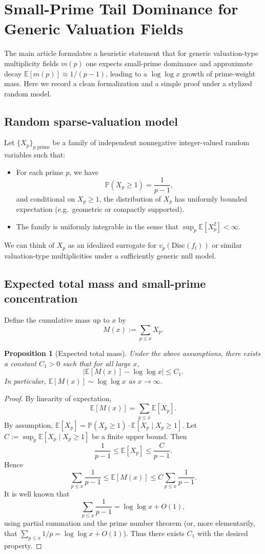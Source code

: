 \documentclass[11pt]{article}
\theoremstyle{definition}
\theoremstyle{plain}
\newtheorem{proposition}[definition]{Proposition}
\theoremstyle{remark}
\newcommand{\EE}{\mathbb{E}}
\newcommand{\Prob}{\mathbb{P}}
\newcommand{\1}{\mathbb{1}}
\begin{document}
\section{Small-Prime Tail Dominance for Generic Valuation Fields}

The main article formulates a heuristic statement that for generic valuation-type multiplicity fields \(m(p)\) one expects small-prime dominance and approximate decay \(\EE[m(p)] \approx 1/(p-1)\), leading to a \(\log\log x\) growth of prime-weight mass. Here we record a clean formalization and a simple proof under a stylized random model.

\subsection{Random sparse-valuation model}

Let \(\{X_p\}_{p \text{ prime}}\) be a family of independent nonnegative integer-valued random variables such that:

\begin{itemize}[leftmargin=*]
  \item For each prime \(p\), we have
  \[
    \Prob(X_p \ge 1) = \frac{1}{p-1},
  \]
  and conditional on \(X_p\ge 1\), the distribution of \(X_p\) has uniformly bounded expectation (e.g.\ geometric or compactly supported).
  \item The family is uniformly integrable in the sense that \(\sup_p \EE[X_p^2] < \infty\).
\end{itemize}

We can think of \(X_p\) as an idealized surrogate for \(v_p(\mathrm{Disc}(f_t))\) or similar valuation-type multiplicities under a sufficiently generic null model.

\subsection{Expected total mass and small-prime concentration}

Define the cumulative mass up to \(x\) by
\[
  M(x) := \sum_{p\le x} X_p.
\]

\begin{proposition}[Expected total mass]
Under the above assumptions, there exists a constant \(C_1 > 0\) such that for all large \(x\),
\[
  \Big|\EE[M(x)] - \log\log x \Big| \le C_1.
\]
In particular, \(\EE[M(x)] \sim \log\log x\) as \(x\to\infty\).
\end{proposition}

\begin{proof}
By linearity of expectation,
\[
  \EE[M(x)] = \sum_{p\le x} \EE[X_p].
\]
By assumption, \(\EE[X_p] = \Prob(X_p\ge 1)\cdot \EE[X_p\mid X_p\ge 1]\). Let \(C := \sup_p \EE[X_p\mid X_p\ge 1]\) be a finite upper bound. Then
\[
  \frac{1}{p-1} \le \EE[X_p] \le \frac{C}{p-1}.
\]
Hence
\[
  \sum_{p\le x} \frac{1}{p-1} \le \EE[M(x)] \le C \sum_{p\le x} \frac{1}{p-1}.
\]
It is well known that
\[
  \sum_{p\le x} \frac{1}{p-1} = \log\log x + O(1),
\]
using partial summation and the prime number theorem (or, more elementarily, that \(\sum_{p\le x} 1/p = \log\log x + O(1)\)). Thus there exists \(C_1\) with the desired property.
\end{proof}
\end{document}
